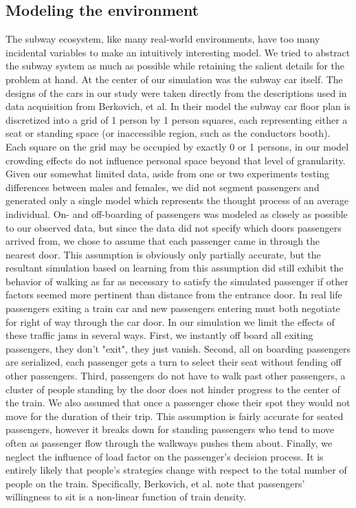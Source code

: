 \documentclass{acm_proc_article-sp}
\begin{document}
\subsection{Modeling the environment}
The subway ecosystem, like many real-world environments, have too many incidental variables to make an intuitively interesting model. We tried to abstract the subway system as much as possible while retaining the salient details for the problem at hand. At the center of our simulation was the subway car itself. The designs of the cars in our study were taken directly from the descriptions used in data acquisition from Berkovich, et al. In their model the subway car floor plan is discretized into a grid of 1 person by 1 person squares, each representing either a seat or standing space (or inaccessible region, such as the conductors booth). Each square on the grid may be occupied by exactly 0 or 1 persons, in our model crowding effects do not influence personal space beyond that level of granularity. Given our somewhat limited data, aside from one or two experiments testing differences between males and females, we did not segment passengers and generated only a single model which represents the thought process of an average individual. On- and off-boarding of passengers was modeled as closely as possible to our observed data, but since the data did not specify which doors passengers arrived from, we chose to assume that each passenger came in through the nearest door. This assumption is obviously only partially accurate, but the resultant simulation based on learning from this assumption did still exhibit the behavior of walking as far as necessary to satisfy the simulated passenger if other factors seemed more pertinent than distance from the entrance door. In real life passengers exiting a train car and new passengers entering must both negotiate for right of way through the car door. In our simulation we limit the effects of these traffic jams in several ways. First, we instantly off board all exiting passengers, they don't "exit", they just vanish. Second, all on boarding passengers are serialized, each passenger gets a turn to select their seat without fending off other passengers. Third, passengers do not have to walk past other passengers, a cluster of people standing by the door does not hinder progress to the center of the train. We also assumed that once a passenger chose their spot they would not move for the duration of their trip. This assumption is fairly accurate for seated passengers, however it breaks down for standing passengers who tend to move often as passenger flow through the walkways pushes them about. Finally, we neglect the influence of load factor on the passenger's decision process. It is entirely likely that people's strategies change with respect to the total number of people on the train. Specifically, Berkovich, et al. note that passengers' willingness to sit is a non-linear function of train density.
\end{document}

